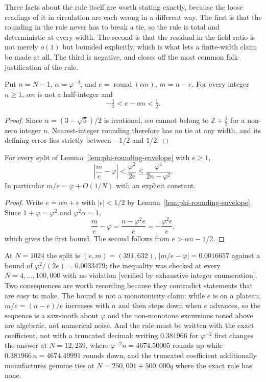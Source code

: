 Three facts about the rule itself are worth stating exactly, because the loose
readings of it in circulation are each wrong in a different way. The first is that
the rounding in the rule never has to break a tie, so the rule is total and
deterministic at every width. The second is that the residual in the field ratio
is not merely $o(1)$ but bounded explicitly, which is what lets a finite-width
claim be made at all. The third is negative, and closes off the most common
folk-justification of the rule.

\begin{lemma}
\label{lem:phi-rounding-envelope}
Put $n=N-1$, $\alpha=\varphi^{-2}$, and $e=\operatorname{round}(\alpha n)$,
$m=n-e$. For every integer $n\geq1$, $\alpha n$ is not a half-integer and
\[
 -\tfrac12 < e-\alpha n < \tfrac12 .
\]
\end{lemma}
\begin{proof}
Since $\alpha=(3-\sqrt5)/2$ is irrational, $\alpha n$ cannot belong to
$\mathbb{Z}+\tfrac12$ for a non-zero integer $n$. Nearest-integer rounding
therefore has no tie at any width, and its defining error lies strictly between
$-1/2$ and $1/2$.
\end{proof}

\begin{corollary}
\label{cor:phi-ratio-bound}
For every split of Lemma~\ref{lem:phi-rounding-envelope} with $e\geq1$,
\[
 \left|\frac{m}{e}-\varphi\right|
 < \frac{\varphi^{2}}{2e}
 \leq \frac{\varphi^{4}}{2n-\varphi^{2}} .
\]
In particular $m/e=\varphi+O(1/N)$ with an explicit constant.
\end{corollary}
\begin{proof}
Write $e=\alpha n+\epsilon$ with $|\epsilon|<1/2$ by
Lemma~\ref{lem:phi-rounding-envelope}. Since $1+\varphi=\varphi^{2}$ and
$\varphi^{2}\alpha=1$,
\[
 \frac{m}{e}-\varphi=\frac{n-\varphi^{2}e}{e}=-\frac{\varphi^{2}\epsilon}{e},
\]
which gives the first bound. The second follows from $e>\alpha n-1/2$.
\end{proof}

At $N=1024$ the split is $(e,m)=(391,632)$, $|m/e-\varphi|=0.0016657$ against a
bound of $\varphi^{2}/(2e)=0.0033479$; the inequality was checked at every
$N=4,\dots,100{,}000$ with no violation [verified by exhaustive integer
enumeration]. Two consequences are worth recording because they contradict
statements that are easy to make. The bound is not a monotonicity claim: while
$e$ is on a plateau, $m/e=(n-e)/e$ increases with $n$ and then steps down when
$e$ advances, so the sequence is a saw-tooth about $\varphi$ and the non-monotone
excursions noted above are algebraic, not numerical noise. And the rule must be
written with the exact coefficient, not with a truncated decimal: writing
$0.381966$ for $\varphi^{-2}$ first changes the answer at $N=12{,}239$, where
$\varphi^{-2}n=4674.50005$ rounds up while $0.381966\,n=4674.49991$ rounds down,
and the truncated coefficient additionally manufactures genuine ties at
$N=250{,}001+500{,}000q$ where the exact rule has none.

